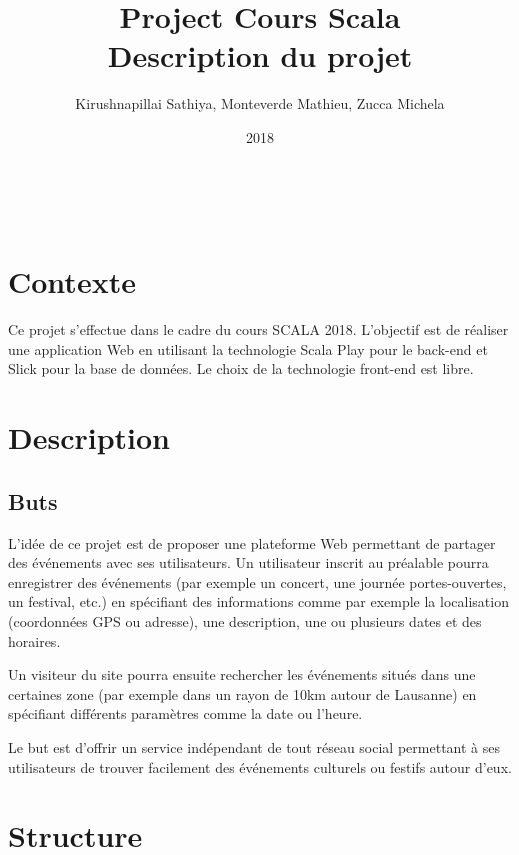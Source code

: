 \documentclass[11pt, a4paper, french, twoside]{article}
\title{Project Cours Scala \\ Description du projet}
\author{Kirushnapillai Sathiya, Monteverde Mathieu, Zucca Michela}
\date{2018}
\begin{document}
	\graphicspath{ {images/} }
	
	\newcommand{\HRule}{\rule{\linewidth}{0.5mm}}
	
	
	\newpage~
	
	\thispagestyle{empty}
	\newpage
	
	\setcounter{page}{1}
	\newpage
	
	\section{Contexte}
	\label{sec:contexte}
		Ce projet s'effectue dans le cadre du cours SCALA 2018. L'objectif est de réaliser une application Web en utilisant la technologie Scala Play pour le back-end et Slick pour la base de données. Le choix de la technologie front-end est libre.
		
	\section{Description}
	\label{sec:description}
	
		\subsection{Buts}
		\label{subsec:buts}
		L'idée de ce projet est de proposer une plateforme Web permettant de partager des événements avec ses utilisateurs. Un utilisateur inscrit au préalable pourra enregistrer des événements (par exemple un concert, une journée portes-ouvertes, un festival, etc.) en spécifiant des informations comme par exemple la localisation (coordonnées GPS ou adresse), une description, une ou plusieurs dates et des horaires.
		
		Un visiteur du site pourra ensuite rechercher les événements situés dans une certaines zone (par exemple dans un rayon de 10km autour de Lausanne) en spécifiant différents paramètres comme la date ou l'heure. 
		
		Le but est d'offrir un service indépendant de tout réseau social permettant à ses utilisateurs de trouver facilement des événements culturels ou festifs autour d'eux. 
		
	\section{Structure}
	\label{sec:structure}
	
	\setlength{\parskip}{0.2cm}
\end{document}
